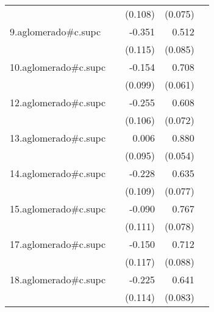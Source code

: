 {\begin{longtable}{l*{4}{D{.}{.}{-1}}}
            &                     &     (0.108)         &     (0.075)         &                     \\
\addlinespace
9.aglomerado#c.supc&                     &      -0.351\sym{**} &       0.512\sym{***}&                     \\
            &                     &     (0.115)         &     (0.085)         &                     \\
\addlinespace
10.aglomerado#c.supc&                     &      -0.154         &       0.708\sym{***}&                     \\
            &                     &     (0.099)         &     (0.061)         &                     \\
\addlinespace
12.aglomerado#c.supc&                     &      -0.255\sym{*}  &       0.608\sym{***}&                     \\
            &                     &     (0.106)         &     (0.072)         &                     \\
\addlinespace
13.aglomerado#c.supc&                     &       0.006         &       0.880\sym{***}&                     \\
            &                     &     (0.095)         &     (0.054)         &                     \\
\addlinespace
14.aglomerado#c.supc&                     &      -0.228\sym{*}  &       0.635\sym{***}&                     \\
            &                     &     (0.109)         &     (0.077)         &                     \\
\addlinespace
15.aglomerado#c.supc&                     &      -0.090         &       0.767\sym{***}&                     \\
            &                     &     (0.111)         &     (0.078)         &                     \\
\addlinespace
17.aglomerado#c.supc&                     &      -0.150         &       0.712\sym{***}&                     \\
            &                     &     (0.117)         &     (0.088)         &                     \\
\addlinespace
18.aglomerado#c.supc&                     &      -0.225\sym{*}  &       0.641\sym{***}&                     \\
            &                     &     (0.114)         &     (0.083)         &                     \\

\end{longtable}}
